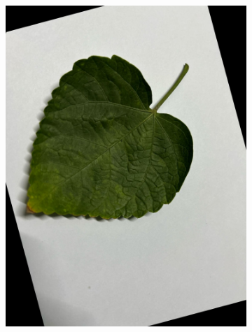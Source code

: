 \documentclass[twocolumn]{article}
\begin{document}
\begin{figure}[H]
\begin{subfigure}[b]{0.30\columnwidth}
        \includegraphics[width=\textwidth]{rosa5}
    \end{subfigure}
    \hfill
    \begin{subfigure}[b]{0.30\columnwidth}

\end{subfigure}
\end{figure}
\end{document}
